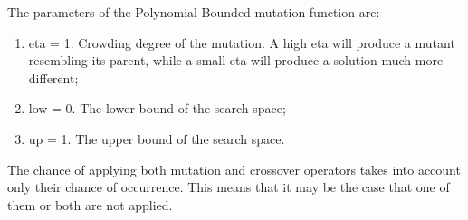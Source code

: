 The parameters of the Polynomial Bounded mutation function are: 
\begin{enumerate}
	\item eta = 1. Crowding degree of the mutation. A high eta will produce a mutant resembling its parent, while a small eta will produce a solution much more different;
	\item low = 0. The lower bound of the search space;
	\item up = 1. The upper bound of the search space.
\end{enumerate}

The chance of applying both mutation and crossover operators takes into account only their chance of occurrence. This means that it may be the case that one of them or both are not applied.

